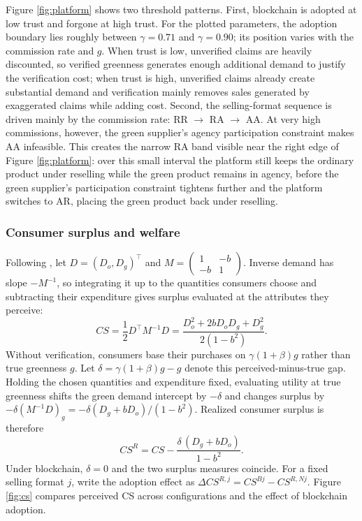 \documentclass[preprint,review,12pt,authoryear,nopreprintline]{elsarticle}
\theoremstyle{definition}
\begin{document}
Figure \ref{fig:platform} shows two threshold patterns. First, blockchain is adopted at low trust and forgone at high trust. For the plotted parameters, the adoption boundary lies roughly between $\gamma=0.71$ and $\gamma=0.90$; its position varies with the commission rate and $g$. When trust is low, unverified claims are heavily discounted, so verified greenness generates enough additional demand to justify the verification cost; when trust is high, unverified claims already create substantial demand and verification mainly removes sales generated by exaggerated claims while adding cost. Second, the selling-format sequence is driven mainly by the commission rate: RR $\rightarrow$ RA $\rightarrow$ AA. At very high commissions, however, the green supplier's agency participation constraint makes AA infeasible. This creates the narrow RA band visible near the right edge of Figure \ref{fig:platform}: over this small interval the platform still keeps the ordinary product under reselling while the green product remains in agency, before the green supplier's participation constraint tightens further and the platform switches to AR, placing the green product back under reselling.

\subsubsection{Consumer surplus and welfare}

Following \citet{singh1984,liu2014ad,wu2015online}, let $D=(D_o,D_g)^\top$ and $M=\left(\begin{smallmatrix}1&-b\\-b&1\end{smallmatrix}\right)$. Inverse demand has slope $-M^{-1}$, so integrating it up to the quantities consumers choose and subtracting their expenditure gives surplus evaluated at the attributes they perceive:
\begin{equation}\label{eq:perceived-cs}
CS=\frac{1}{2}D^\top M^{-1}D
=\frac{D_o^2+2bD_oD_g+D_g^2}{2(1-b^2)}.
\end{equation}
Without verification, consumers base their purchases on $\gamma(1+\beta)g$ rather than true greenness $g$. Let $\delta=\gamma(1+\beta)g-g$ denote this perceived-minus-true gap. Holding the chosen quantities and expenditure fixed, evaluating utility at true greenness shifts the green demand intercept by $-\delta$ and changes surplus by $-\delta(M^{-1}D)_g=-\delta(D_g+bD_o)/(1-b^2)$. Realized consumer surplus is therefore
\begin{equation}\label{eq:realized-cs}
CS^{R}=CS-\frac{\delta\,(D_g+bD_o)}{1-b^2}.
\end{equation}
Under blockchain, $\delta=0$ and the two surplus measures coincide. For a fixed selling format $j$, write the adoption effect as $\Delta CS^{R,j}=CS^{Bj}-CS^{R,Nj}$. Figure \ref{fig:cs} compares perceived CS across configurations and the effect of blockchain adoption.
\end{document}
